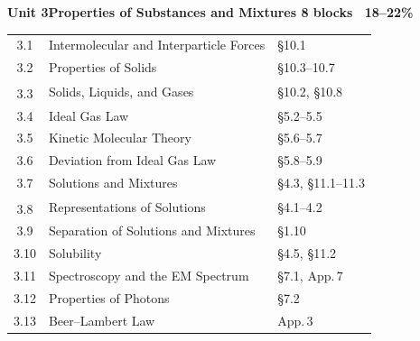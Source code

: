 \documentclass[10pt]{article}
\makeatletter
\newcommand{\uband}[3]{%
  \par\vspace{1pt}\noindent
  \colorbox{apclight}{\begin{minipage}{\dimexpr\linewidth-2\fboxsep\relax}
    \sffamily\bfseries\footnotesize\color{apcaccent}Unit #1\quad#2%
    \hfill\normalfont\footnotesize\color{apcgray}#3
  \end{minipage}}\par\vspace{1pt}%
}
\newcommand{\dg}{\textsuperscript{\dag}}
\newenvironment{utab}{\begin{tabular}{@{}C@{\hspace{2pt}}T@{\hspace{2pt}}Z@{}}}{\end{tabular}\par}
\makeatother
\begin{document}
\begin{minipage}[t]{3.28in}
\uband{3}{Properties of Substances and Mixtures}{8 blocks \textbullet\ \textbf{18--22\%}}
\begin{utab}
3.1 & Intermolecular and Interparticle Forces & \S10.1\\
3.2 & Properties of Solids & \S10.3--10.7\\
3.3\dg & Solids, Liquids, and Gases & \S10.2, \S10.8\\
3.4 & Ideal Gas Law & \S5.2--5.5\\
3.5 & Kinetic Molecular Theory & \S5.6--5.7\\
3.6 & Deviation from Ideal Gas Law & \S5.8--5.9\\
3.7 & Solutions and Mixtures & \S4.3, \S11.1--11.3\\
3.8\dg & Representations of Solutions & \S4.1--4.2\\
3.9 & Separation of Solutions and Mixtures & \S1.10\\
3.10 & Solubility & \S4.5, \S11.2\\
3.11 & Spectroscopy and the EM Spectrum & \S7.1, App.\,7\\
3.12 & Properties of Photons & \S7.2\\
3.13 & Beer--Lambert Law & App.\,3\\
\end{utab}
\end{minipage}%
\hfill
\end{document}
